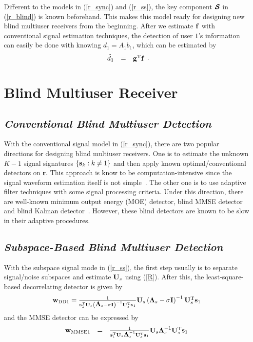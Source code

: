 \documentclass[a4paper,10pt,fleqn, twocolumn]{IEEETran}
\newcommand{\br}{{\mathbf r}}
\newcommand{\bg}{{\bf g}}
\newcommand{\bs}{{\bf s}}
\newcommand{\bw}{{\bf w}}
\newcommand{\bbf}{{\bf f}}
\newcommand{\bI}{{\bf I}}
\newcommand{\bU}{{\bf U}}
\newcommand{\bLambda}{{\mbox {\boldmath $\Lambda$}}}
\newcommand{\bcS}{{\mbox {\boldmath ${\cal S}$}}}
\begin{document}
Different to the models in (\ref{r_sync}) and (\ref{r_ss}), the
key component $\bcS$ in (\ref{r_blind}) is known beforehand. This
makes this model ready for designing new blind multiuser receivers
from the beginning. After we estimate $\bbf$ with conventional
signal estimation techniques, the detection of user $1$'s
information can easily be done with knowing $d_1=A_1b_1$, which
can be estimated by
\begin{equation}
\begin{array}{rcl}
\hat{d}_{1} &=&\bg^{\rm T}\bbf
\end{array}.\label{d_1}
\end{equation}

\section{Blind Multiuser Receiver}
\subsection{\em Conventional Blind Multiuser Detection}
With the conventional signal model in (\ref{r_sync}), there are
two popular directions for designing blind multiuser receivers.
One is to estimate the unknown $K-1$ signal signatures
$\left\{\bs_k:k\neq1\right\}$ and then apply known
optimal/conventional detectors on $\br$. This approach is know to
be computation-intensive since the signal waveform estimation
itself is not simple~\cite{Torl97}. The other one is to use
adaptive filter techniques with some signal processing criteria.
Under this direction, there are well-known minimum output energy
(MOE) detector, blind MMSE detector and blind Kalman
detector~\cite{Honi95,Verd98,Zhang02}. However, these blind
detectors are known to be slow in their adaptive procedures.

\subsection{\em Subspace-Based Blind Multiuser Detection}
With the subspace signal mode in (\ref{r_ss}), the first step
usually is to separate signal/noise subspaces and estimate
$\bU_{s}$ using (\ref{R}). After this, the least-square-based
decorrelating detector is given by
\begin{equation}
\begin{array}{l}
\bw_{\rm DD1}=\frac{1}{\bs_1^{\rm
T}\bU_{s}\left(\bLambda_{s}-\sigma\bI\right)^{-1}\bU_{s}^{\rm
T}\bs_{1}}\bU_{s}\left(\bLambda_{s}-\sigma\bI\right)^{-1}\bU_{s}^{\rm
T}\bs_{1}
\end{array}
\end{equation}
\noindent and the MMSE detector can be expressed by
\begin{equation}
\begin{array}{rcl}
\bw_{\rm MMSE1}&=&\frac{1}{\bs_1^{\rm
T}\bU_{s}\bLambda_{s}^{-1}\bU_{s}^{\rm
T}\bs_{1}}\bU_{s}\bLambda_{s}^{-1}\bU_{s}^{\rm T}\bs_{1}
\end{array}
\end{equation}
\end{document}
